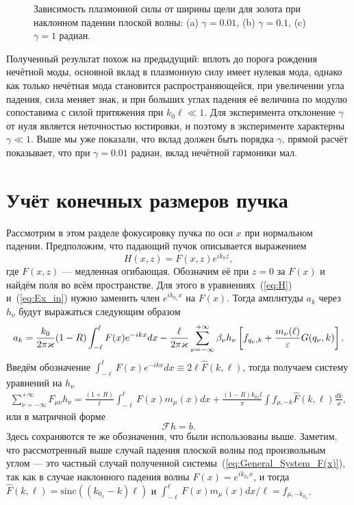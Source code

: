 \begin{figure}
\begin{subfigure}[t]{0.6\textwidth}
        \caption{}  
    \end{subfigure}
    \caption{Зависимость плазмонной силы от ширины щели для золота при наклонном падении плоской волны: (a) $\gamma = 0.01$, (b) $\gamma = 0.1$, (c)  $\gamma = 1$ радиан.}
    \label{fig:Force100_angle}
\end{figure}

Полученный результат похож на предыдущий: вплоть до порога рождения нечётной моды, основной вклад в плазмонную силу имеет нулевая мода, однако как только нечётная мода становится распространяющейся, при увеличении угла падения, сила меняет знак, и при больших углах падения её величина по модулю сопоставима с силой притяжения при $k_0 \ell \ll 1$. Для эксперимента отклонение $\gamma$ от нуля является неточностью юстировки, и поэтому в эксперименте характерны $\gamma \ll 1$. Выше мы уже показали, что вклад должен быть порядка $\gamma$, прямой расчёт показывает, что при $\gamma = 0.01$ радиан, вклад нечётной гармоники мал.

\section{Учёт конечных размеров пучка}

Рассмотрим в этом разделе фокусировку пучка по оси $x$ при нормальном падении. Предположим, что падающий пучок описывается выражением
\begin{equation}
    H(x,z) = F(x,z)e^{i k_0 z},
\end{equation}
где $F(x,z)$ --- медленная огибающая. Обозначим её при $z = 0$ за $F(x)$ и найдём поля во всём пространстве. Для этого в уравнениях~(\ref{eq:H}) и~(\ref{eq:Ex_in}) нужно заменить член $e^{i k_{0_{x}}x}$ на $F(x)$. Тогда амплитуды $a_k$ через $h_\nu$ будут выражаться следующим образом
\begin{equation}
    a_k = \frac{k_0}{ 2\pi \varkappa} (1-R)\int_{-\ell}^\ell F(x) e^{-ikx}dx - \frac{\ell}{2 \pi \varkappa}\sum_{\nu = -\infty}^{+\infty} \beta_\nu h_\nu\left[f_{q_\nu,k}
+ \frac{m_\nu(\ell)}{\varepsilon}G(q_\nu,k)\right].
\label{eq:ak_F(x)}
\end{equation}
Введём обозначение $\int_{-\ell}^\ell F(x) e^{-ikx}dx \equiv 2\ell \hat{F}(k,\ell)$, тогда получаем систему уравнений на $h_\nu$ 
\begin{align}
	\sum_{\nu=-\infty}^{+\infty} F_{\mu \nu} h_\nu = \frac{(1+R)}{\ell}\int_{-\ell}^\ell F(x) m_\mu(x)dx + \frac{(1-R)k_{0z} l}{\pi}\int f_{\mu,-k}\hat{F}(k,\ell) \frac{dk}{\varkappa}, \label{eq:General_System_F(x)}
\end{align}
или в матричной форме
\begin{equation}
    \mathcal{F} h = b.
    \label{eq:matrix_form_F(x)}
\end{equation}
Здесь сохраняются те же обозначения, что были использованы выше. Заметим, что рассмотренный выше случай падения плоской волны под произвольным углом --- это частный случай полученной системы~(\ref{eq:General_System_F(x)}), так как в случае наклонного падения волны $F(x) = e^{i k_{0_x}x}$, и тогда $\hat{F}(k,\ell) = \text{sinc}((k_{0_x} - k)\ell)$ и $\int_{-\ell}^\ell F(x) m_\mu(x)dx/\ell = f_{\mu,-k_{0_x}}$.

